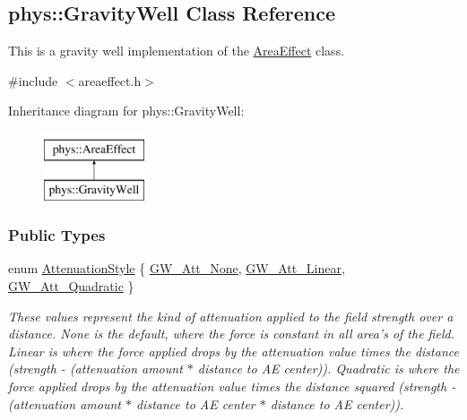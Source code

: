 \hypertarget{classphys_1_1GravityWell}{
\subsection{phys::GravityWell Class Reference}
\label{d6/d21/classphys_1_1GravityWell}
}


This is a gravity well implementation of the \hyperlink{classphys_1_1AreaEffect}{AreaEffect} class.  




{\ttfamily \#include $<$areaeffect.h$>$}

Inheritance diagram for phys::GravityWell:\begin{figure}[H]
\begin{center}
\leavevmode
\includegraphics[height=2.000000cm]{d6/d21/classphys_1_1GravityWell}
\end{center}
\end{figure}
\subsubsection*{Public Types}
\begin{DoxyCompactItemize}
\item 
enum \hyperlink{classphys_1_1GravityWell_a72d0da5f140b91bc364f2c46e7536e1f}{AttenuationStyle} \{ \hyperlink{classphys_1_1GravityWell_a72d0da5f140b91bc364f2c46e7536e1fa1429a2da7d5eccb56f773b12f67d2dc3}{GW\_\-Att\_\-None}, 
\hyperlink{classphys_1_1GravityWell_a72d0da5f140b91bc364f2c46e7536e1fa266647471ad2a0f86c272b8ff7ddd342}{GW\_\-Att\_\-Linear}, 
\hyperlink{classphys_1_1GravityWell_a72d0da5f140b91bc364f2c46e7536e1fac181ac3728c9280d52ccb355a5b9247f}{GW\_\-Att\_\-Quadratic}
 \}
\begin{DoxyCompactList}\small\item\em These values represent the kind of attenuation applied to the field strength over a distance. None is the default, where the force is constant in all area's of the field. Linear is where the force applied drops by the attenuation value times the distance (strength -\/ (attenuation amount $\ast$ distance to AE center)). Quadratic is where the force applied drops by the attenuation value times the distance squared (strength -\/ (attenuation amount $\ast$ distance to AE center $\ast$ distance to AE center)). \item\end{DoxyCompactList}\end{DoxyCompactItemize}
